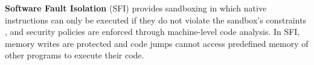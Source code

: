 \textbf{Software Fault Isolation} (SFI) 
provides sandboxing in which native
instructions can only be executed if they do not violate the sandbox's
constraints \cite{SFI:93}, and security policies are enforced through machine-level
code analysis. In SFI, memory
writes are protected and code jumps cannot access predefined memory of
other programs to execute their code.
%
%
%
%
